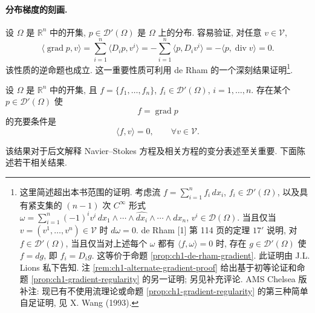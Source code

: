 \paragraph{分布梯度的刻画.}
设 $\Omega$ 是 $\mathbb R^n$ 中的开集, $p\in\mathcal D'(\Omega)$ 是 $\Omega$ 上的分布. 容易验证, 对任意 $v\in\mathcal V$,
\begin{equation}
\langle\operatorname{grad}p,v\rangle
=\sum_{i=1}^n\langle D_i p,v^i\rangle
=-\sum_{i=1}^n\langle p,D_i v^i\rangle
=-\langle p,\operatorname{div}v\rangle=0.
\label{eq:ch1-gradient-annihilates-v}
\end{equation}
该性质的逆命题也成立. 这一重要性质可利用 de Rham 的一个深刻结果证明\footnote{这里简述超出本书范围的证明. 考虑流 $f=\sum_{i=1}^n f_i\,dx_i$, $f_i\in\mathcal D'(\Omega)$, 以及具有紧支集的 $(n-1)$ 次 $C^\infty$ 形式 $\omega=\sum_{i=1}^n(-1)^iv^i\,dx_1\wedge\cdots\wedge\widehat{dx_i}\wedge\cdots\wedge dx_n$, $v^i\in\mathcal D(\Omega)$. 当且仅当 $v=(v^1,\ldots,v^n)\in\mathcal V$ 时 $d\omega=0$. de Rham [1] 第 114 页的定理 $17'$ 说明, 对 $f\in\mathcal D'(\Omega)$, 当且仅当对上述每个 $\omega$ 都有 $\langle f,\omega\rangle=0$ 时, 存在 $g\in\mathcal D'(\Omega)$ 使 $f=dg$, 即 $f_i=D_i g$. 这等价于命题 \ref{prop:ch1-de-rham-gradient}. 此证明由 J.L. Lions 私下告知. 注 \ref{rem:ch1-alternate-gradient-proof} 给出基于初等论证和命题 \ref{prop:ch1-gradient-regularity} 的另一证明; 另见补充评论. AMS Chelsea 版补注: 现已有不使用流理论或命题 \ref{prop:ch1-gradient-regularity} 的第三种简单自足证明, 见 X. Wang (1993).}.

\begin{Proposition}
\label{prop:ch1-de-rham-gradient}
设 $\Omega$ 是 $\mathbb R^n$ 中的开集, 且 $f=\{f_1,\ldots,f_n\}$, $f_i\in\mathcal D'(\Omega)$, $i=1,\ldots,n$. 存在某个 $p\in\mathcal D'(\Omega)$ 使
\begin{equation}
f=\operatorname{grad}p
\label{eq:ch1-distribution-gradient}
\end{equation}
的充要条件是
\begin{equation}
\langle f,v\rangle=0,
\qquad\forall v\in\mathcal V.
\label{eq:ch1-distribution-gradient-condition}
\end{equation}
\end{Proposition}

该结果对于后文解释 Navier--Stokes 方程及相关方程的变分表述至关重要. 下面陈述若干相关结果.

